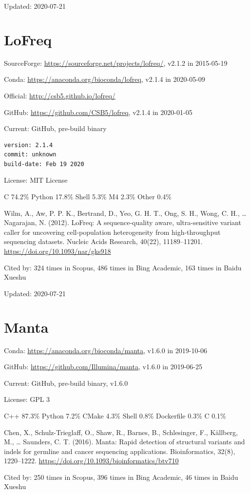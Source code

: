 \documentclass[]{article}
\newcommand{\cb}[3]{\par Cited by: {\color{blue}\Huge #1} times in Scopus, {\color{blue}\Huge #2} times in Bing Academic, {\color{blue}\Huge #3} times in Baidu Xueshu}
\begin{document}
Updated: 2020-07-21

\section{LoFreq}

SourceForge: \url{https://sourceforge.net/projects/lofreq/}, v2.1.2 in 2015-05-19

Conda: \url{https://anaconda.org/bioconda/lofreq}, v2.1.4 in 2020-05-09

Official: \url{http://csb5.github.io/lofreq/}

GitHub: \url{https://github.com/CSB5/lofreq}, v2.1.4 in 2020-01-05

Current: GitHub, pre-build binary

\begin{verbatim}
version: 2.1.4
commit: unknown
build-date: Feb 19 2020
\end{verbatim}

License: MIT License

C 74.2\% Python 17.8\% Shell 5.3\% M4 2.3\% Other 0.4\%

Wilm, A., Aw, P. P. K., Bertrand, D., Yeo, G. H. T., Ong, S. H., Wong, C. H., … Nagarajan, N. (2012). LoFreq: A sequence-quality aware, ultra-sensitive variant caller for uncovering cell-population heterogeneity from high-throughput sequencing datasets. Nucleic Acids Research, 40(22), 11189–11201. \url{https://doi.org/10.1093/nar/gks918}\cb{324}{486}{163}

Updated: 2020-07-21
\section{Manta}

Conda: \url{https://anaconda.org/bioconda/manta}, v1.6.0 in 2019-10-06

GitHub: \url{https://github.com/Illumina/manta}, v1.6.0 in 2019-06-25

Current: GitHub, pre-build binary, v1.6.0

License: GPL 3

C++ 87.3\% Python 7.2\% CMake 4.3\% Shell 0.8\% Dockerfile 0.3\% C 0.1\%

Chen, X., Schulz-Trieglaff, O., Shaw, R., Barnes, B., Schlesinger, F., Källberg, M., … Saunders, C. T. (2016). Manta: Rapid detection of structural variants and indels for germline and cancer sequencing applications. Bioinformatics, 32(8), 1220–1222. \url{https://doi.org/10.1093/bioinformatics/btv710}\cb{250}{396}{46}
\end{document}
